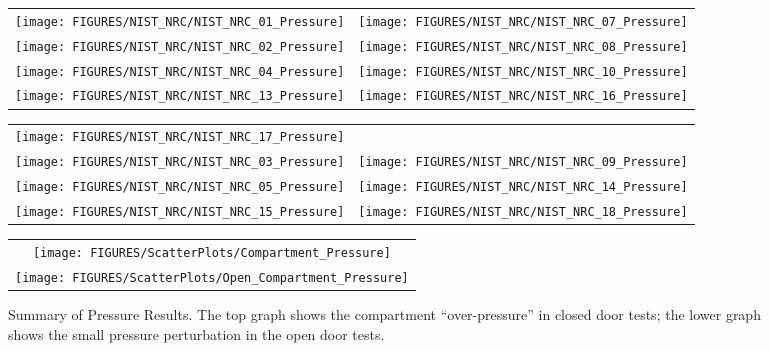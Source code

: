 \begin{figure}[p]
\begin{tabular*}{\textwidth}{l@{\extracolsep{\fill}}r}
\texttt{[image: FIGURES/NIST\_NRC/NIST\_NRC\_01\_Pressure]} &
\texttt{[image: FIGURES/NIST\_NRC/NIST\_NRC\_07\_Pressure]} \\
\texttt{[image: FIGURES/NIST\_NRC/NIST\_NRC\_02\_Pressure]} &
\texttt{[image: FIGURES/NIST\_NRC/NIST\_NRC\_08\_Pressure]} \\
\texttt{[image: FIGURES/NIST\_NRC/NIST\_NRC\_04\_Pressure]} &
\texttt{[image: FIGURES/NIST\_NRC/NIST\_NRC\_10\_Pressure]} \\
\texttt{[image: FIGURES/NIST\_NRC/NIST\_NRC\_13\_Pressure]} &
\texttt{[image: FIGURES/NIST\_NRC/NIST\_NRC\_16\_Pressure]}
\end{tabular*}
\label{NIST_NRC_Pressure_Closed}
\end{figure}

\begin{figure}[p]
\begin{tabular*}{\textwidth}{l@{\extracolsep{\fill}}r}
\texttt{[image: FIGURES/NIST\_NRC/NIST\_NRC\_17\_Pressure]} &
   \\
\texttt{[image: FIGURES/NIST\_NRC/NIST\_NRC\_03\_Pressure]} &
\texttt{[image: FIGURES/NIST\_NRC/NIST\_NRC\_09\_Pressure]} \\
\texttt{[image: FIGURES/NIST\_NRC/NIST\_NRC\_05\_Pressure]} &
\texttt{[image: FIGURES/NIST\_NRC/NIST\_NRC\_14\_Pressure]} \\
\texttt{[image: FIGURES/NIST\_NRC/NIST\_NRC\_15\_Pressure]} &
\texttt{[image: FIGURES/NIST\_NRC/NIST\_NRC\_18\_Pressure]}
\end{tabular*}
\label{NIST_NRC_Pressure_Open}
\end{figure}

\begin{figure}[p]
\begin{center}
\begin{tabular}{c}
\texttt{[image: FIGURES/ScatterPlots/Compartment\_Pressure]} \\
\texttt{[image: FIGURES/ScatterPlots/Open\_Compartment\_Pressure]}
\end{tabular}
\end{center}
\caption[Summary of pressure predictions, NIST/NRC test series.]
{Summary of Pressure Results. The top graph shows the compartment ``over-pressure'' in closed door tests; the lower graph
shows the small pressure perturbation in the open door tests.}
\end{figure}


